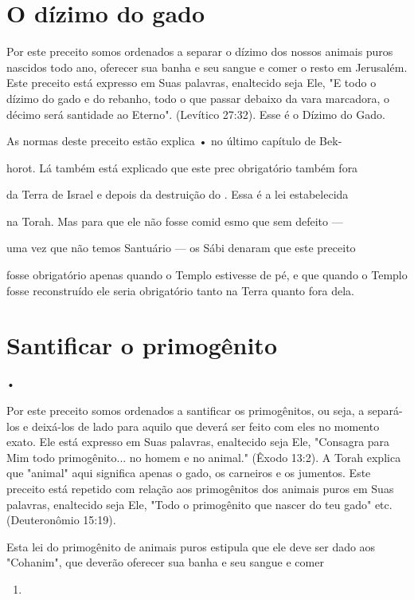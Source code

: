 \begin{itemize}
\begin{enumrate}
\begin{itemize}
\begin{itemize}
\section{O dízimo do gado}

Por este preceito somos ordenados a separar o dízimo dos nossos animais
puros nascidos todo ano, oferecer sua banha e seu sangue e comer o resto
em Jerusalém. Este preceito está expresso em Suas palavras, enaltecido
seja Ele, "E todo o dízimo do gado e do rebanho, todo o que passar
debaixo da vara marcadora, o décimo será santidade ao Eterno". (Levítico
27:32). Esse é o Dízimo do Gado.


As normas deste preceito estão explica • no último capítulo de Bek-


horot. Lá também está explicado que este prec obrigatório também fora

da Terra de Israel e depois da destruição do . Essa é a lei estabelecida

na Torah. Mas para que ele não fosse comid esmo que sem defeito ---

uma vez que não temos Santuário --- os Sábi denaram que este preceito

fosse obrigatório apenas quando o Templo estivesse de pé, e que quando o
Tem­plo fosse reconstruído ele seria obrigatório tanto na Terra quanto
fora dela.


\section{Santificar o primogênito}


•

Por este preceito somos ordenados a santificar os primogênitos, ou seja,
a separá-los e deixá-los de lado para aquilo que deverá ser feito com
eles no momento exato. Ele está expresso em Suas palavras, enaltecido
seja Ele, "Con­sagra para Mim todo primogênito... no homem e no animal."
(Êxodo 13:2). A Torah explica que "animal" aqui significa apenas o gado,
os carneiros e os ju­mentos. Este preceito está repetido com relação aos
primogênitos dos animais puros em Suas palavras, enaltecido seja Ele,
"Todo o primogênito que nascer do teu gado" etc. (Deuteronômio 15:19).

Esta lei do primogênito de animais puros estipula que ele deve ser dado
aos "Cohanim", que deverão oferecer sua banha e seu sangue e comer


\begin{enumerate}
\def\labelenumi{\arabic{enumi}.}
\setcounter{enumi}{100}
\item
 

\end{enumerate}
\end{itemize}
\end{itemize}
\end{enumrate}
\end{itemize}
